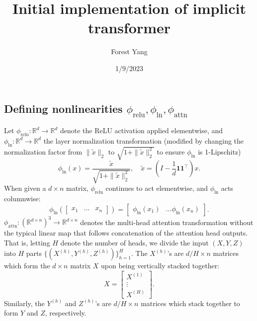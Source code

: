 \documentclass{article}
\begin{document}
\title{Initial implementation of implicit transformer}
\author{Forest Yang}
\date{1/9/2023}
\maketitle
\subsection{Defining nonlinearities \texorpdfstring{$\phi_\text{relu}, 
\phi_\text{ln}, \phi_\text{attn}$}{}}
Let $\phi_\text{relu}:\mathbb R^d\to\mathbb R^d$ denote the ReLU activation
applied elementwise, and $\phi_\text{ln}:\mathbb R^d\to\mathbb R^d$ 
the layer normalization transformation (modified by changing the normalization
factor from $\|\tilde x\|_2$ to $\sqrt{1 + \|\tilde x\|_2^2}$ to ensure 
$\phi_\text{ln}$ is 1-Lipschitz)
\begin{equation*}
  \phi_\text{ln}(x) = \frac{\tilde x}{\sqrt{1+\|\tilde x\|_2^2}},\quad
  \tilde x = (I - \frac1d \boldsymbol1\boldsymbol1^\top)x.
\end{equation*}
When given a $d\times n$ matrix, $\phi_\text{relu}$ continues to act 
elementwise, and $\phi_\text{ln}$ acts columnwise: 
\begin{equation*}
  \phi_\text{ln}\left(\begin{bmatrix} x_1 & \ldots & x_n\end{bmatrix}\right)
    = \begin{bmatrix} \phi_\text{ln}(x_1) & \ldots \phi_\text{ln}(x_n)
    \end{bmatrix}.
\end{equation*}
$\phi_\text{attn}:(\mathbb R^{d\times n})^3\to\mathbb R^{d\times n}$
denotes the multi-head attention transformation without the typical linear
map that follows concatenation of the attention head outputs. That is,
letting $H$ denote the number of heads, we divide the input $(X, Y, Z)$ 
into $H$ parts $\{(X^{(h)}, Y^{(h)}, Z^{(h)})\}_{h=1}^H$. The $X^{(h)}$'s are  
$d/H\times n$ matrices which form the $d\times n$ matrix $X$ upon being 
vertically stacked together:
\begin{equation*}
  X = \begin{bmatrix} X^{(1)} \\\vdots\\ X^{(H)}\end{bmatrix}.
\end{equation*}
Similarly, the $Y^{(h)}$ and $Z^{(h)}$'s are 
$d/H\times n$ matrices which stack together to form $Y$ and $Z$, respectively.
\end{document}
